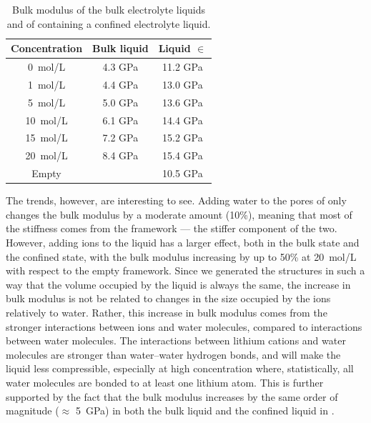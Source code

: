 \documentclass[thesis]{subfiles}
\begin{document}
\begin{table}[ht]
    \caption{Bulk modulus of the bulk electrolyte liquids and of 
    containing a confined electrolyte liquid.}
    \label{table:bulk}
    \centering
    \renewcommand{\arraystretch}{1.5}
    \begin{tabular}{c c c}
        \toprule
        Concentration   & Bulk liquid  & Liquid $\in$ \ZIF8 \\
        \midrule
        \SI{0}{mol/L}   &    4.3 GPa   &  11.2 GPa    \\
        \SI{1}{mol/L}   &    4.4 GPa   &  13.0 GPa    \\
        \SI{5}{mol/L}   &    5.0 GPa   &  13.6 GPa    \\
        \SI{10}{mol/L}  &    6.1 GPa   &  14.4 GPa    \\
        \SI{15}{mol/L}  &    7.2 GPa   &  15.2 GPa    \\
        \SI{20}{mol/L}  &    8.4 GPa   &  15.4 GPa    \\
        \bottomrule
        Empty \ZIF8     &              &  10.5 GPa     \\
        \bottomrule
    \end{tabular}
\end{table}

The trends, however, are interesting to see. Adding water to the pores of 
only changes the bulk modulus by a moderate amount (10\%), meaning that most of
the stiffness comes from the  framework --- the stiffer component of the
two. However, adding ions to the liquid has a larger effect, both in the bulk
state and the confined state, with the bulk modulus increasing by up to 50\% at
\SI{20}{mol/L} with respect to the empty framework. Since we generated the
structures in such a way that the volume occupied by the liquid is always the
same, the increase in bulk modulus is not be related to changes in the size
occupied by the ions relatively to water.  Rather, this increase in bulk modulus
comes from the stronger interactions between ions and water molecules, compared
to interactions between water molecules. The interactions between lithium
cations and water molecules are stronger than water--water hydrogen bonds, and
will make the liquid less compressible, especially at high concentration where,
statistically, all water molecules are bonded to at least one lithium atom. This
is further supported by the fact that the bulk modulus increases by the same
order of magnitude ($\approx$ \SI{5}{GPa}) in both the bulk liquid and the
confined liquid in .
\end{document}
